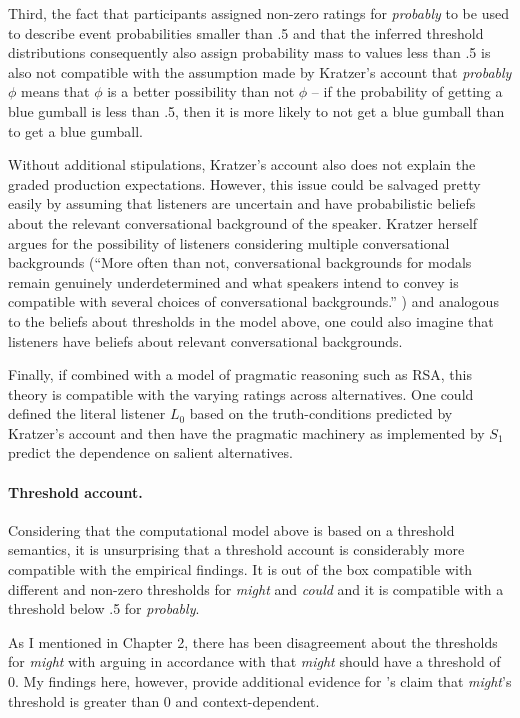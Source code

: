 Third, the fact that participants assigned non-zero ratings for \textit{probably} to be used to describe event probabilities smaller than .5 and that the
inferred threshold distributions consequently also assign probability mass to values less than .5 is also not compatible with the assumption made by 
Kratzer's account that \textit{probably} $\phi$ means that $\phi$ is a better possibility than not $\phi$ -- if the probability of getting a blue gumball is less than
.5, then it is more likely to not get a blue gumball than to get a blue gumball.

Without additional stipulations, Kratzer's account also does not explain the graded production expectations. However, this issue could be salvaged pretty easily
by assuming that listeners are uncertain and have probabilistic beliefs about the relevant conversational background of the speaker. Kratzer herself argues for the possibility
of listeners considering multiple conversational backgrounds (``More often than not, conversational backgrounds for modals remain genuinely underdetermined and what speakers intend to convey is compatible with several choices of conversational backgrounds.'' \cite{Kratzer2012,Ch2,p32}) and analogous to the beliefs about thresholds in the model above, one could also imagine that listeners have
beliefs about relevant conversational backgrounds.

Finally, if combined with a model of pragmatic reasoning such as RSA, this theory is compatible with the varying ratings across alternatives. One could defined
the literal listener $L_0$ based on the truth-conditions predicted by Kratzer's account and then have the pragmatic machinery as implemented by $S_1$ 
predict the dependence on salient alternatives. 

\paragraph{Threshold account.} Considering that the computational model above is based on a threshold semantics, 
it is unsurprising that a threshold account is considerably more compatible with the empirical findings. It is out of the box compatible
with different and non-zero thresholds for \textit{might} and \textit{could} and it is compatible with a threshold below .5 for \textit{probably}.

As I mentioned in Chapter 2, there has been disagreement about the thresholds for \textit{might} with \cite{Yalcin2010} arguing in accordance with
\cite{Kratzer1991} that \textit{might} should have a threshold of 0. My findings here, however, provide additional evidence for \cite{Lassiter2017}'s
claim that \textit{might}'s threshold is greater than 0 and context-dependent.


